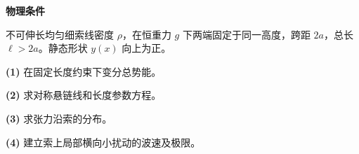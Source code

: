 \textbf{物理条件}\par 不可伸长均匀细索线密度 \(\rho\)，在恒重力 \(g\) 下两端固定于同一高度，跨距 \(2a\)，总长 \(\ell>2a\)。静态形状 \(y(x)\) 向上为正。
\par\noindent\textbf{(1)} 在固定长度约束下变分总势能。
\par\noindent\textbf{(2)} 求对称悬链线和长度参数方程。
\par\noindent\textbf{(3)} 求张力沿索的分布。
\par\noindent\textbf{(4)} 建立索上局部横向小扰动的波速及极限。
